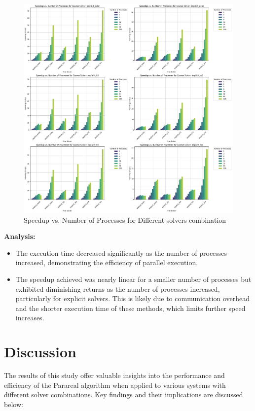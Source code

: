 \documentclass[a4paper,12pt,french]{article}
\begin{document}
\begin{figure}[ht!]
    \centering
    \includegraphics[width=1\textwidth]{img/perf.png}
    \caption{Speedup vs. Number of Processes for Different solvers combination}
    \label{fig:7}
\end{figure}
\newpage
\textbf{Analysis:}
\begin{itemize}
    \item The execution time decreased significantly as the number of processes increased, demonstrating the efficiency of parallel execution.
    \item The speedup achieved was nearly linear for a smaller number of processes but exhibited diminishing returns as the number of processes increased, particularly for explicit solvers. This is likely due to communication overhead and the shorter execution time of these methods, which limits further speed increases.
\end{itemize}

\section{Discussion}
The results of this study offer valuable insights into the performance and efficiency of the Parareal algorithm when applied to various systems with different solver combinations. Key findings and their implications are discussed below:
\end{document}
